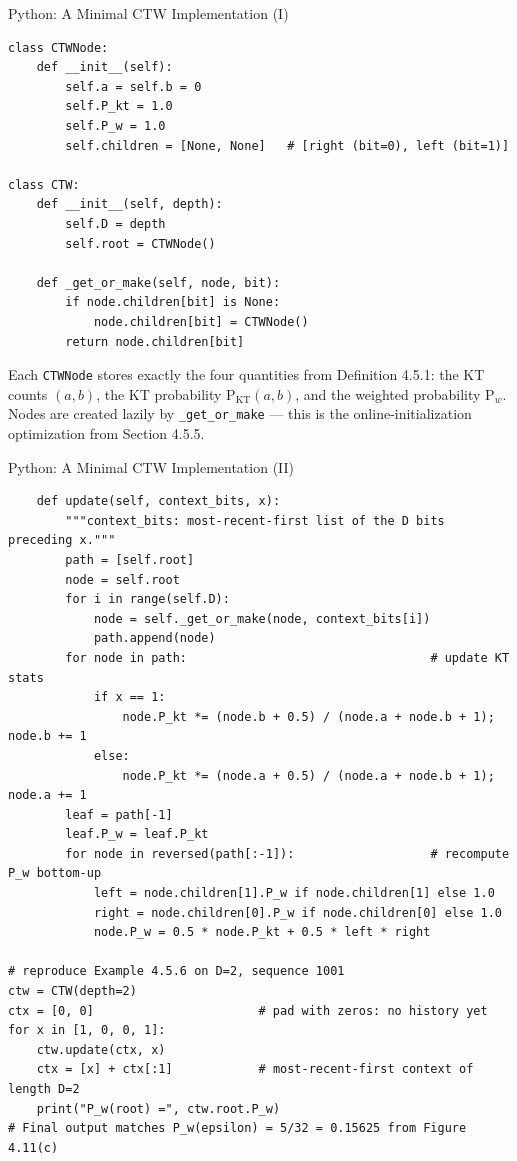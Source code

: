 \documentclass[aspectratio=169,10pt]{beamer}
\newcommand{\PKT}{\mathrm{P}_{\mathrm{KT}}}
\newcommand{\Pw}{\mathrm{P}_w}
\begin{document}
\begin{frame}[fragile]{Python: A Minimal CTW Implementation (I)}
\begin{lstlisting}
class CTWNode:
    def __init__(self):
        self.a = self.b = 0
        self.P_kt = 1.0
        self.P_w = 1.0
        self.children = [None, None]   # [right (bit=0), left (bit=1)]

class CTW:
    def __init__(self, depth):
        self.D = depth
        self.root = CTWNode()

    def _get_or_make(self, node, bit):
        if node.children[bit] is None:
            node.children[bit] = CTWNode()
        return node.children[bit]
\end{lstlisting}
Each \texttt{CTWNode} stores exactly the four quantities from Definition 4.5.1: the KT
counts $(a,b)$, the KT probability $\PKT(a,b)$, and the weighted probability $\Pw$. Nodes
are created lazily by \texttt{\_get\_or\_make} --- this is the online-initialization
optimization from Section 4.5.5.
\end{frame}

\begin{frame}[fragile]{Python: A Minimal CTW Implementation (II)}
\begin{lstlisting}
    def update(self, context_bits, x):
        """context_bits: most-recent-first list of the D bits preceding x."""
        path = [self.root]
        node = self.root
        for i in range(self.D):
            node = self._get_or_make(node, context_bits[i])
            path.append(node)
        for node in path:                                  # update KT stats
            if x == 1:
                node.P_kt *= (node.b + 0.5) / (node.a + node.b + 1); node.b += 1
            else:
                node.P_kt *= (node.a + 0.5) / (node.a + node.b + 1); node.a += 1
        leaf = path[-1]
        leaf.P_w = leaf.P_kt
        for node in reversed(path[:-1]):                   # recompute P_w bottom-up
            left = node.children[1].P_w if node.children[1] else 1.0
            right = node.children[0].P_w if node.children[0] else 1.0
            node.P_w = 0.5 * node.P_kt + 0.5 * left * right

# reproduce Example 4.5.6 on D=2, sequence 1001
ctw = CTW(depth=2)
ctx = [0, 0]                       # pad with zeros: no history yet
for x in [1, 0, 0, 1]:
    ctw.update(ctx, x)
    ctx = [x] + ctx[:1]            # most-recent-first context of length D=2
    print("P_w(root) =", ctw.root.P_w)
# Final output matches P_w(epsilon) = 5/32 = 0.15625 from Figure 4.11(c)
\end{lstlisting}
\end{frame}
\end{document}
